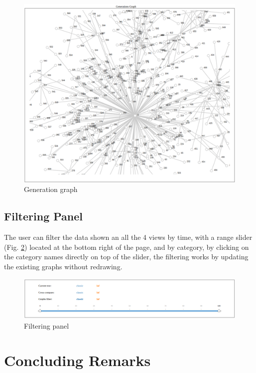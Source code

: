 \documentclass[conference,compsoc]{IEEEtran}
\begin{document}
\begin{figure}[H]
  \includegraphics[scale=0.25]{img/tree}
  \centering
  \caption{Generation graph}
  \label{fig:tree}
\end{figure}

\subsection{Filtering Panel}
The user can filter the data shown an all the 4 views by time, with a range slider (Fig. \ref{fig:panel}) located at the bottom right of the page, and by category, by clicking on the category names directly on top of the slider, the filtering works by updating the existing graphs without redrawing.

\begin{figure}[h]
  \includegraphics[scale=0.25]{img/panel}
  \centering
  \caption{Filtering panel}
  \label{fig:panel}
\end{figure}

\section{Concluding Remarks}
\end{document}

